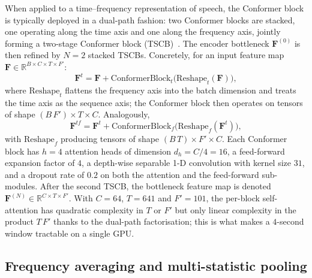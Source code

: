 \documentclass[a4paper,fleqn]{cas-dc}
\begin{document}
When applied to a time--frequency representation of speech, the
Conformer block is typically deployed in a dual-path fashion: two
Conformer blocks are stacked, one operating along the time axis and one
along the frequency axis, jointly forming a two-stage Conformer block
(TSCB)~\citep{cao2022cmgan}. The encoder bottleneck $\mathbf{F}^{(0)}$
is then refined by $N=2$ stacked TSCBs. Concretely, for an input
feature map $\mathbf{F}\in\mathbb{R}^{B\times C\times T\times F'}$:
\begin{equation}\label{eq:tscb_time}
  \mathbf{F}^{t} = \mathbf{F}
      + \mathrm{ConformerBlock}_{t}\bigl(\mathrm{Reshape}_{t}(\mathbf{F})\bigr),
\end{equation}
where $\mathrm{Reshape}_{t}$ flattens the frequency axis into the batch
dimension and treats the time axis as the sequence axis; the Conformer
block then operates on tensors of shape $(B\,F')\times T\times C$.
Analogously,
\begin{equation}\label{eq:tscb_freq}
  \mathbf{F}^{tf} = \mathbf{F}^{t}
      + \mathrm{ConformerBlock}_{f}\bigl(\mathrm{Reshape}_{f}(\mathbf{F}^{t})\bigr),
\end{equation}
with $\mathrm{Reshape}_{f}$ producing tensors of shape $(B\,T)\times
F'\times C$. Each Conformer block has $h=4$ attention heads of dimension
$d_h=C/4=16$, a feed-forward expansion factor of $4$, a depth-wise
separable 1-D convolution with kernel size $31$, and a dropout rate of
$0.2$ on both the attention and the feed-forward sub-modules. After
the second TSCB, the bottleneck feature map is denoted
$\mathbf{F}^{(N)}\in\mathbb{R}^{C\times T\times F'}$. With $C=64$,
$T=641$ and $F'=101$, the per-block self-attention has quadratic
complexity in $T$ or $F'$ but only linear complexity in the product
$T\,F'$ thanks to the dual-path factorisation; this is what makes a
$4$-second window tractable on a single GPU.

\subsection{Frequency averaging and multi-statistic pooling}\label{sec:method:pool}
\end{document}

